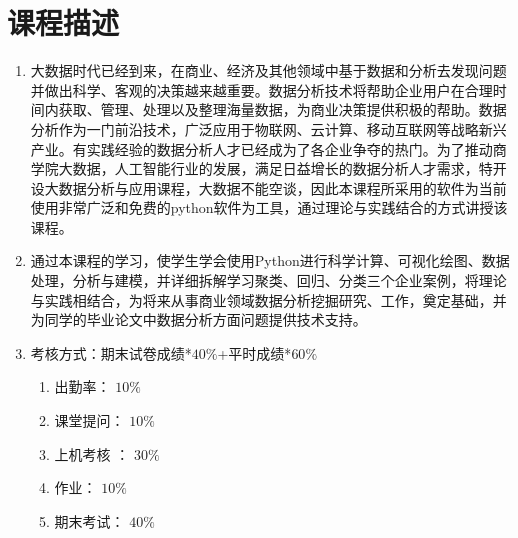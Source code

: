 \documentclass[12pt,a4paper,openany,cap]{ctexbook}
\begin{document}
\section{课程描述}
\begin{enumerate}
\item 大数据时代已经到来，在商业、经济及其他领域中基于数据和分析去发现问题并做出科学、客观的决策越来越重要。数据分析技术将帮助企业用户在合理时间内获取、管理、处理以及整理海量数据，为商业决策提供积极的帮助。数据分析作为一门前沿技术，广泛应用于物联网、云计算、移动互联网等战略新兴产业。有实践经验的数据分析人才已经成为了各企业争夺的热门。为了推动商学院大数据，人工智能行业的发展，满足日益增长的数据分析人才需求，特开设大数据分析与应用课程，大数据不能空谈，因此本课程所采用的软件为当前使用非常广泛和免费的python软件为工具，通过理论与实践结合的方式讲授该课程。
\item\label{item:21} 通过本课程的学习，使学生学会使用Python进行科学计算、可视化绘图、数据处理，分析与建模，并详细拆解学习聚类、回归、分类三个企业案例，将理论与实践相结合，为将来从事商业领域数据分析挖掘研究、工作，奠定基础，并为同学的毕业论文中数据分析方面问题提供技术支持。
\item\label{item:22} 考核方式：期末试卷成绩*$40\%$+平时成绩*$60\%$
  \begin{enumerate}
  \item 出勤率：    $10  \%   $
\item\label{item:23} 课堂提问：   $10 \% $
\item\label{item:40} 上机考核 ：     $30\%$
\item\label{item:41} 作业：   $10  \%$
\item\label{item:42} 期末考试：   $40  \%$
  \end{enumerate}
\end{enumerate}
\end{document}
